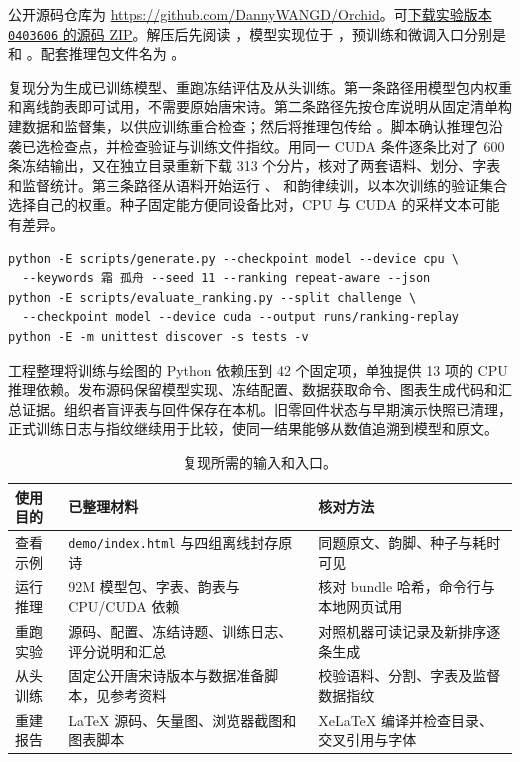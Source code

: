 公开源码仓库为 \url{https://github.com/DannyWANGD/Orchid}。可\href{https://codeload.github.com/DannyWANGD/Orchid/zip/040360649f565f08109eadd4bb861219cb63256b}{下载实验版本 \texttt{0403606} 的源码 ZIP}。解压后先阅读 ，模型实现位于 ，预训练和微调入口分别是  和 。配套推理包文件名为 。

复现分为生成已训练模型、重跑冻结评估及从头训练。第一条路径用模型包内权重和离线韵表即可试用，不需要原始唐宋诗。第二条路径先按仓库说明从固定清单构建数据和监督集，以供应训练重合检查；然后将推理包传给 。脚本确认推理包沿袭已选检查点，并检查验证与训练文件指纹。用同一 CUDA 条件逐条比对了 600 条冻结输出，又在独立目录重新下载 313 个分片，核对了两套语料、划分、字表和监督统计。第三条路径从语料开始运行 、 和韵律续训，以本次训练的验证集合选择自己的权重。种子固定能方便同设备比对，CPU 与 CUDA 的采样文本可能有差异。

\begin{tcolorbox}[consolestyle]
\begin{Verbatim}[fontsize=\small,breaklines=true]
python -E scripts/generate.py --checkpoint model --device cpu \
  --keywords 霜 孤舟 --seed 11 --ranking repeat-aware --json
python -E scripts/evaluate_ranking.py --split challenge \
  --checkpoint model --device cuda --output runs/ranking-replay
python -E -m unittest discover -s tests -v
\end{Verbatim}
\end{tcolorbox}

工程整理将训练与绘图的 Python 依赖压到 42 个固定项，单独提供 13 项的 CPU 推理依赖。发布源码保留模型实现、冻结配置、数据获取命令、图表生成代码和汇总证据。组织者盲评表与回件保存在本机。旧零回件状态与早期演示快照已清理，正式训练日志与指纹继续用于比较，使同一结果能够从数值追溯到模型和原文。

\begin{table}[!htbp]
\centering
\caption{复现所需的输入和入口。}
\label{tab:deliverables}
\begin{tabularx}{\linewidth}{@{}p{.20\linewidth}Y Y@{}}
\toprule
使用目的 & 已整理材料 & 核对方法\\
\midrule
查看示例 & \texttt{demo/index.html} 与四组离线封存原诗 & 同题原文、韵脚、种子与耗时可见\\
运行推理 & 92M 模型包、字表、韵表与 CPU/CUDA 依赖 & 核对 bundle 哈希，命令行与本地网页试用\\
重跑实验 & 源码、配置、冻结诗题、训练日志、评分说明和汇总 & 对照机器可读记录及新排序逐条生成\\
从头训练 & 固定公开唐宋诗版本与数据准备脚本，见参考资料 & 校验语料、分割、字表及监督数据指纹\\
重建报告 & LaTeX 源码、矢量图、浏览器截图和图表脚本 & XeLaTeX 编译并检查目录、交叉引用与字体\\
\bottomrule
\end{tabularx}
\end{table}

